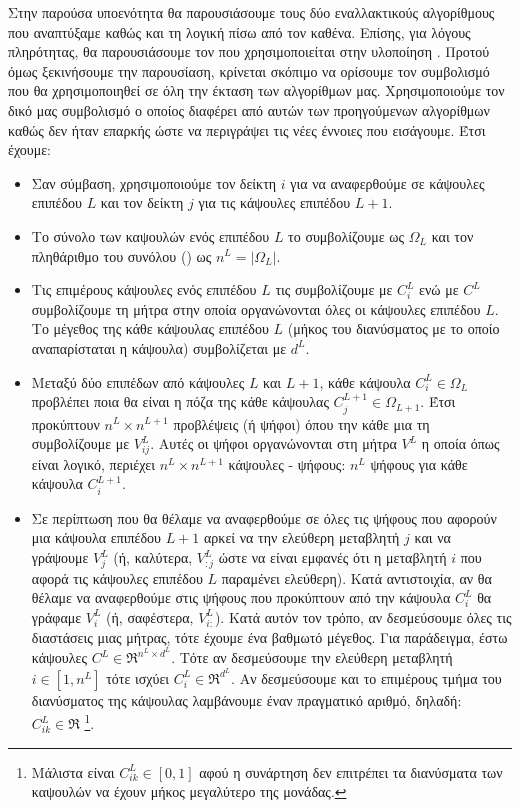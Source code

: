 Στην παρούσα υποενότητα θα παρουσιάσουμε τους δύο εναλλακτικούς αλγορίθμους που αναπτύξαμε καθώς και τη λογική πίσω από τον καθένα. Επίσης, για λόγους πληρότητας, θα παρουσιάσουμε τον  που χρησιμοποιείται στην υλοποίηση \cite{mazzia2021efficient}. Προτού όμως ξεκινήσουμε την παρουσίαση, κρίνεται σκόπιμο να ορίσουμε τον συμβολισμό που θα χρησιμοποιηθεί σε όλη την έκταση των αλγορίθμων μας. Χρησιμοποιούμε τον δικό μας συμβολισμό ο οποίος διαφέρει από αυτών των προηγούμενων αλγορίθμων καθώς δεν ήταν επαρκής ώστε να περιγράψει τις νέες έννοιες που εισάγουμε. Έτσι έχουμε:
\begin{itemize}
  \item Σαν σύμβαση, χρησιμοποιούμε τον δείκτη $i$ για να αναφερθούμε σε κάψουλες επιπέδου $L$ και τον δείκτη $j$ για τις κάψουλες επιπέδου $L+1$.
  \item Το σύνολο των καψουλών ενός επιπέδου $L$ το συμβολίζουμε ως $\Omega_L$ και τον πληθάριθμο του συνόλου () ως $n^L = \left\lvert \Omega_L \right\rvert$.
  \item Τις επιμέρους κάψουλες ενός επιπέδου $L$ τις συμβολίζουμε με $C^L_i$ ενώ με $C^L$ συμβολίζουμε τη μήτρα στην οποία οργανώνονται όλες οι κάψουλες επιπέδου $L$. Το μέγεθος της κάθε κάψουλας επιπέδου $L$ (μήκος του διανύσματος με το οποίο αναπαρίσταται η κάψουλα) συμβολίζεται με $d^L$.
  \item Μεταξύ δύο επιπέδων από κάψουλες $L$ και $L+1$, κάθε κάψουλα $C^L_i \in \Omega_L$ προβλέπει ποια θα είναι η πόζα της κάθε κάψουλας $C^{L+1}_j \in \Omega_{L+1}$. Έτσι προκύπτουν $n^L \times n^{L+1}$ προβλέψεις (ή ψήφοι) όπου την κάθε μια τη συμβολίζουμε με $V_{ij}^L$. Αυτές οι ψήφοι οργανώνονται στη μήτρα $V^L$ η οποία όπως είναι λογικό, περιέχει $n^L \times n^{L+1}$ κάψουλες - ψήφους: $n^L$ ψήφους για κάθε κάψουλα $C^{L+1}_i$.
  \item Σε περίπτωση που θα θέλαμε να αναφερθούμε σε όλες τις ψήφους που αφορούν μια κάψουλα επιπέδου $L+1$ αρκεί να  την ελεύθερη μεταβλητή $j$ και να γράψουμε $V^L_j$ (ή, καλύτερα, $V^L_{:j}$ ώστε να είναι εμφανές ότι η μεταβλητή $i$ που αφορά τις κάψουλες επιπέδου $L$ παραμένει ελεύθερη). Κατά αντιστοιχία, αν θα θέλαμε να αναφερθούμε στις ψήφους που προκύπτουν από την κάψουλα $C^L_i$ θα γράφαμε $V^L_i$ (ή, σαφέστερα, $V^L_{i:}$). Κατά αυτόν τον τρόπο, αν δεσμεύσουμε όλες τις διαστάσεις μιας μήτρας, τότε έχουμε ένα βαθμωτό μέγεθος. Για παράδειγμα, έστω κάψουλες $C^L \in \Re^{n^L \times d^L}$. Τότε αν δεσμεύσουμε την ελεύθερη μεταβλητή $i \in [1, n^L]$ τότε ισχύει $C_i^L \in \Re^{d^L}$. Αν δεσμεύσουμε και το επιμέρους τμήμα του διανύσματος της κάψουλας λαμβάνουμε έναν πραγματικό αριθμό, δηλαδή: $C_{ik}^L \in \Re$ \footnote{Μάλιστα είναι $C_{ik}^L \in [0,1]$ αφού η συνάρτηση  δεν επιτρέπει τα διανύσματα των καψουλών να έχουν μήκος μεγαλύτερο της μονάδας.}.

\end{itemize}
